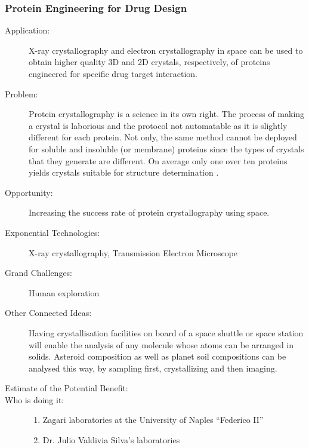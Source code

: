  
\subsubsection{Protein Engineering for Drug Design}
\label{bio-research}
 
\begin{description}  \item[Application:] X-ray \gls{crystallography} and electron \gls{crystallography}  in space can be used to obtain higher quality 3D and 2D crystals,  respectively, of proteins engineered for specific drug target  interaction.
 
\item[Problem:] Protein \gls{crystallography} is a science in its own right. The process of making a  crystal is laborious and the protocol not automatable as it is slightly  different for each protein. Not only, the same method cannot be deployed  for soluble and insoluble (or membrane) proteins since the types of  crystals that they generate are different. On average only one over ten  proteins yields crystals suitable for structure determination \cite{Vergara2005}.
 
\item[Opportunity:] Increasing the  success rate of protein \gls{crystallography} using space.
 
\item[Exponential Technologies:]  X-ray \gls{crystallography}, Transmission Electron Microscope
 
\item[Grand Challenges:] Human exploration
 
\item[Other Connected Ideas:]  Having crystallisation facilities on board of a space shuttle or space  station will enable the analysis of any molecule whose atoms can be  arranged in solids. Asteroid composition as well as planet soil  compositions can be analysed this way, by sampling first, crystallizing  and then imaging.
 
\item[Estimate of the Potential  Benefit:]
 
\item[Who is doing it:]
\hfill\begin{enumerate}
\item Zagari laboratories at the  University of Naples ``Federico II''
\item  Dr. Julio Valdivia Silva's laboratories
\end{enumerate}
 

\end{description}
